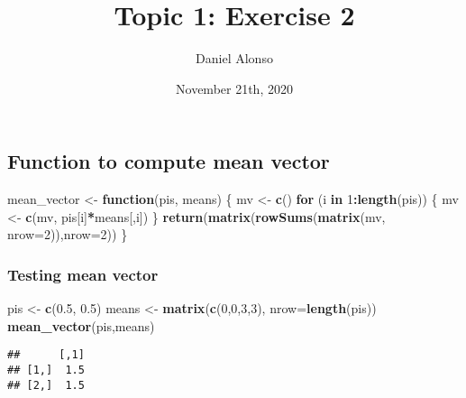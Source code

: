 \documentclass[]{article}
\title{Topic 1: Exercise 2}
\author{Daniel Alonso}
\date{November 21th, 2020}
\newenvironment{Shaded}{\begin{snugshade}}{\end{snugshade}}
\newcommand{\ControlFlowTok}[1]{\textcolor[rgb]{0.13,0.29,0.53}{\textbf{#1}}}
\newcommand{\DataTypeTok}[1]{\textcolor[rgb]{0.13,0.29,0.53}{#1}}
\newcommand{\DecValTok}[1]{\textcolor[rgb]{0.00,0.00,0.81}{#1}}
\newcommand{\FloatTok}[1]{\textcolor[rgb]{0.00,0.00,0.81}{#1}}
\newcommand{\KeywordTok}[1]{\textcolor[rgb]{0.13,0.29,0.53}{\textbf{#1}}}
\newcommand{\NormalTok}[1]{#1}
\newcommand{\OperatorTok}[1]{\textcolor[rgb]{0.81,0.36,0.00}{\textbf{#1}}}
\newcommand{\StringTok}[1]{\textcolor[rgb]{0.31,0.60,0.02}{#1}}
\begin{document}
\maketitle

\hypertarget{function-to-compute-mean-vector}{%
\subsection{Function to compute mean
vector}\label{function-to-compute-mean-vector}}

\begin{Shaded}
\begin{Highlighting}[]
\NormalTok{mean_vector <-}\StringTok{ }\ControlFlowTok{function}\NormalTok{(pis, means) \{}
\NormalTok{    mv <-}\StringTok{ }\KeywordTok{c}\NormalTok{()}
    \ControlFlowTok{for}\NormalTok{ (i }\ControlFlowTok{in} \DecValTok{1}\OperatorTok{:}\KeywordTok{length}\NormalTok{(pis)) \{}
\NormalTok{        mv <-}\StringTok{ }\KeywordTok{c}\NormalTok{(mv, pis[i]}\OperatorTok{*}\NormalTok{means[,i])}
\NormalTok{    \}}
    \KeywordTok{return}\NormalTok{(}\KeywordTok{matrix}\NormalTok{(}\KeywordTok{rowSums}\NormalTok{(}\KeywordTok{matrix}\NormalTok{(mv, }\DataTypeTok{nrow=}\DecValTok{2}\NormalTok{)),}\DataTypeTok{nrow=}\DecValTok{2}\NormalTok{))}
\NormalTok{\}}
\end{Highlighting}
\end{Shaded}

\hypertarget{testing-mean-vector}{%
\subsubsection{Testing mean vector}\label{testing-mean-vector}}

\begin{Shaded}
\begin{Highlighting}[]
\NormalTok{pis <-}\StringTok{ }\KeywordTok{c}\NormalTok{(}\FloatTok{0.5}\NormalTok{, }\FloatTok{0.5}\NormalTok{)}
\NormalTok{means <-}\StringTok{ }\KeywordTok{matrix}\NormalTok{(}\KeywordTok{c}\NormalTok{(}\DecValTok{0}\NormalTok{,}\DecValTok{0}\NormalTok{,}\DecValTok{3}\NormalTok{,}\DecValTok{3}\NormalTok{), }\DataTypeTok{nrow=}\KeywordTok{length}\NormalTok{(pis))}
\KeywordTok{mean_vector}\NormalTok{(pis,means)}
\end{Highlighting}
\end{Shaded}

\begin{verbatim}
##      [,1]
## [1,]  1.5
## [2,]  1.5
\end{verbatim}
\end{document}
